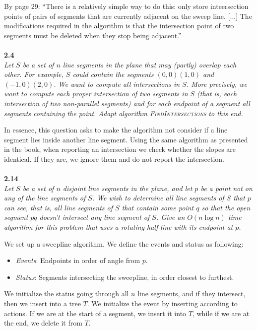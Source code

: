 By page 29: ``There is a relatively simple way to do this: only store inteersection points of pairs of segments that are currently adjacent on the sweep line. [...] The modifications required in the algorithm is that the intersection point of two segments must be deleted when they stop being adjacent.''
\\\\
\noindent
\textbf{2.4}\\
\noindent
\textit{Let $S$ be a set of $n$ line segments in the plane that may (partly) overlap each other. For example, $S$ could contain the segments $(0,0)(1,0)$ and $(-1,0)(2,0)$. We want to compute all intersections in $S$. More precisely, we want to compute each proper intersection of two segments in $S$ (that is, each intersection of two non-parallel segments) and for each endpoint of a segment all segments containing the point. Adapt algorithm \textsc{FindIntersections} to this end.}

In essence, this question asks to make the algorithm not consider if a line segment lies inside another line segment. Using the same algorithm as presented in the book, when reporting an intersection we check whether the slopes are identical. If they are, we ignore them and do not report the intersection.
\\\\
\noindent
\textbf{2.14}\\
\noindent
\textit{Let $S$ be a set of $n$ disjoint line segments in the plane, and let $p$ be a point not on any of the line segments of $S$. We wish to determine all line segments of $S$ that $p$ can see, that is, all line segments of $S$ that contain some point $q$ so that the open segment $\overline{pq}$ doesn't intersect any line segment of $S$. Give an $O(n \log n)$ time algorithm for this problem that uses a rotating half-line with its endpoint at $p$.}

We set up a sweepline algorithm. We define the events and status as following:
\begin{itemize}
	\item \textit{Events}: Endpoints in order of angle from $p$.
	\item \textit{Status}: Segments intersecting the sweepline, in order closest to furthest.
\end{itemize}

We initialize the status going through all $n$ line segments, and if they intersect, then we insert into a tree $T$. We initialize the event by inserting according to actions. If we are at the start of a segment, we insert it into $T$, while if we are at the end, we delete it from $T$.

